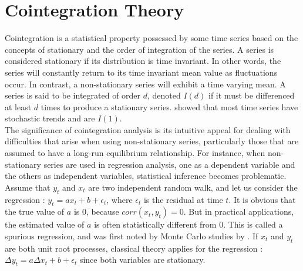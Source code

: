 \documentclass[11pt,a4,twosided,singlespacing,titlepagenumber=on]{scrreprt}
\numberwithin{equation}{chapter} %
\theoremstyle{remark}
\begin{document}
\section{Cointegration Theory}
Cointegration is a statistical property possessed by some time series based on the concepts of stationary and the order of integration of the series. A series is considered stationary if its distribution is time invariant. In other words, the series will constantly return to its time invariant mean value as fluctuations occur. In contrast, a non-stationary series will exhibit a time varying mean. A series is said to be integrated of order $d$, denoted $I(d)$ if it must be differenced at least $d$ times to produce a stationary series.
\cite{nelson1982} showed that most time series have stochastic trends and are $I(1)$. \\


The significance of cointegration analysis is its intuitive appeal for dealing with difficulties that arise when using non-stationary series, particularly those that are assumed to have a long-run equilibrium relationship. For instance, when non-stationary series are used in regression analysis, one as a dependent variable and the others as independent variables, statistical inference becomes problematic. Assume that $y_t$ and $x_t$ are two independent random walk, and let us consider the regression : $y_t = a x_t + b + \epsilon_t$, where $\epsilon_t$ is the residual at time $t$. It is obvious that the true value of $a$ is 0, because $corr(x_t, y_t) = 0$. But in practical applications, the estimated value of $a$ is often statistically different from 0. This is called a spurious regression, and was first noted by Monte Carlo studies by \cite{granger1974}. If $x_t$ and $y_t$ are both unit root processes, classical theory applies for the regression : $\Delta y_t = a \Delta x_t + b + \epsilon_t$ since both variables are stationary. \\
\end{document}

